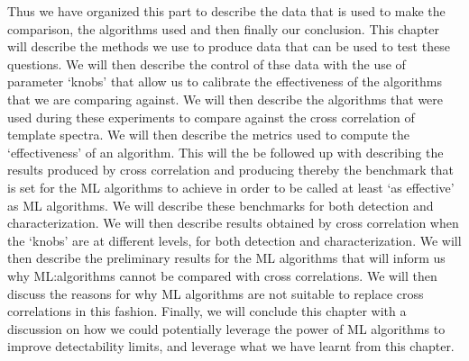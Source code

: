 Thus we have organized this part to describe the data that is used to make the comparison, the algorithms used and then finally our conclusion.
This chapter will describe the methods we use to produce data that can be used to test these questions.
We will then describe the control of thse data with the use of parameter `knobs' that allow us to calibrate the effectiveness of the algorithms that we are comparing against.
We will then describe the algorithms that were used during these experiments to compare against the cross correlation of template spectra. 
We will then describe the metrics used to compute the `effectiveness' of an algorithm.
This will the be followed up with describing the results produced by cross correlation and producing thereby the benchmark that is set for the ML algorithms to achieve in order to be called at least `as effective' as ML algorithms.
We will describe these benchmarks for both detection and characterization.
We will then describe results obtained by  cross correlation when the `knobs' are at different levels, for both detection and characterization.
We will then describe the preliminary results for the ML algorithms that will inform us why ML:algorithms cannot be compared with cross correlations.
We will then discuss the reasons for why ML algorithms are not suitable to replace cross correlations in this fashion.
Finally, we will conclude this chapter with a discussion on how we could potentially leverage the power of ML algorithms to improve detectability limits, and leverage what we have learnt from this chapter.